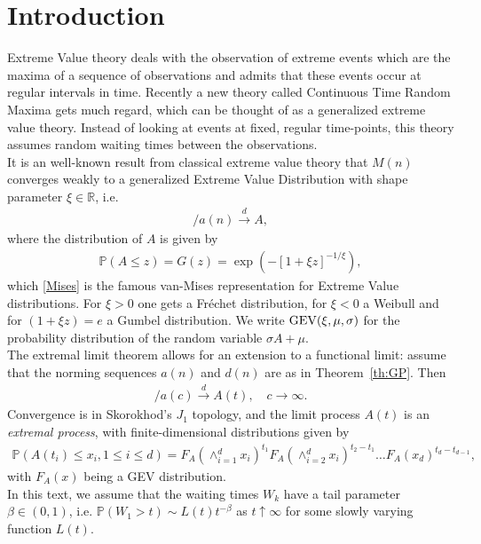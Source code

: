 \documentclass[12pt]{article}
\newcommand{\PP}{\mathbb{P}}
\newcommand{\1}{\mathbf 1}
\begin{document}
\section{Introduction}
Extreme Value theory deals with the observation of extreme events which are the maxima of a sequence of observations and admits that these events occur at regular intervals in time. Recently a new theory called Continuous Time Random Maxima gets much regard, which can be thought of as a generalized extreme value theory. Instead of looking at events at fixed, regular time-points, this theory assumes random waiting times between the observations.\\    
It is an well-known result from classical extreme value theory that $M(n)$ converges weakly to a generalized Extreme Value Distribution with shape parameter $\xi \in \mathbb R$, i.e.
\begin{align}
[M(n) - d(n)] / a(n) \stackrel{d}{\to} A,
\end{align}
where the distribution of $A$ is given by
\begin{align}
\PP(A \le z) = G(z) = \exp\left(-[1+\xi z]^{-1/\xi}\right), \label{Mises}
\end{align}
which \eqref{Mises} is the famous van-Mises representation for Extreme Value distributions. For $\xi>0$ one gets a Fréchet distribution, for $\xi<0$ a Weibull and for $(1+\xi z)=e$ a Gumbel distribution. We write ${\rm GEV}(\xi, \mu, \sigma)$ for the probability 
distribution of the random variable $\sigma A + \mu$. \\
The extremal limit theorem allows for an extension to a functional
limit: assume that the norming sequences $a(n)$ and $d(n)$ are as 
in Theorem~\ref{th:GP}. Then 
\begin{align*}
[M(\lfloor ct \rfloor) - d(c)] / a(c) \stackrel{d}{\to} A(t),
\quad c \to \infty.
\end{align*}
Convergence is in Skorokhod's $J_1$ topology, and the limit
process $A(t)$ is an \emph{extremal process}, with
finite-dimensional distributions given by
\begin{align*}
\PP(A(t_i)\leq x_i,1\leq i \leq d) 
= F_A(\wedge_{i=1}^d x_i)^{t_1} 
F_A(\wedge_{i=2}^d x_i)^{t_2-t_1}
\ldots F_A(x_d)^{t_d-t_{d-1}},
\end{align*}
with $F_A(x)$ being a GEV distribution. \\
In this text, we assume that the waiting times $W_k$ have a tail
parameter $\beta \in (0,1)$, i.e. 
$\PP(W_1 > t) \sim L(t) t^{-\beta}$ as $t \uparrow \infty$ for some slowly varying function $L(t)$.  
\end{document}
